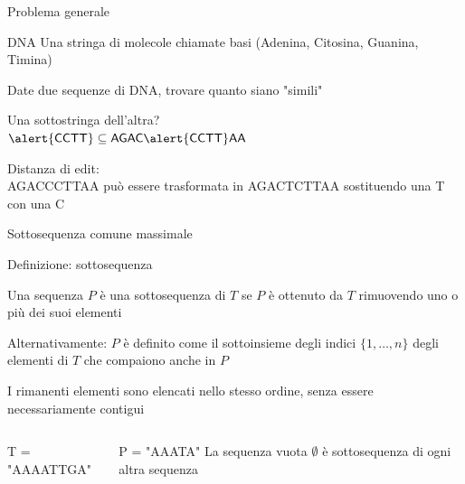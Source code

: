 \begin{frame}{Problema generale}

\begin{block}{DNA}
Una stringa di molecole chiamate basi (\alert{A}denina, \alert{C}itosina, \alert{G}uanina, \alert{T}imina)
\end{block}


Date due sequenze di DNA, trovare quanto siano "simili"

\bigskip
{}
\BIL
\item Una \alert{sottostringa} dell'altra?\\
$\alert{\textsf{CCTT}} \subseteq \textsf{AGAC\alert{CCTT}AA}$
\item \alert{Distanza di edit}:\\
\textsf{AGAC\alert{C}CTTAA} può essere trasformata in \textsf{AGAC\alert{T}CTTAA} sostituendo
una \textsf{T} con una \textsf{C}
\EIL

\end{frame}


\begin{frame}{Sottosequenza comune massimale}

\begin{block}{Definizione: sottosequenza}
\BIL
\item Una sequenza $P$ è una \alert{sottosequenza} di $T$ se $P$ è ottenuto da $T$
rimuovendo uno o più dei suoi elementi
\item Alternativamente: $P$ è definito come il sottoinsieme degli indici $\{ 1, \ldots, n \}$
degli elementi di $T$ che compaiono anche in $P$
\item I rimanenti elementi sono elencati nello stesso ordine, senza essere necessariamente contigui
\EIL
\end{block}

\begin{columns}[T]
\BIL
\item T = "\textsf{\alert{AAA}AT\alert{T}G\alert{A}}"
\item P = "\textsf{AAATA}"
\EIL
{}
\smallskip
La sequenza vuota $\emptyset$ è sottosequenza di ogni altra sequenza
\end{columns}

\end{frame}


